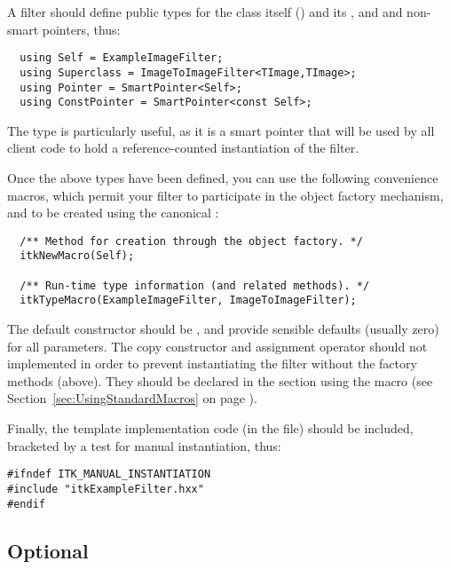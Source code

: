 A filter should define public types for the class itself () and
its , and  and non- smart pointers,
thus:

\begin{verbatim}
  using Self = ExampleImageFilter;
  using Superclass = ImageToImageFilter<TImage,TImage>;
  using Pointer = SmartPointer<Self>;
  using ConstPointer = SmartPointer<const Self>;
\end{verbatim}

The  type is particularly useful, as it is a smart pointer
that will be used by all client code to hold a reference-counted
instantiation of the filter.

Once the above types have been defined, you can use the following
convenience macros, which permit your filter to participate in the object
factory mechanism, and to be created using the canonical :

\begin{verbatim}
  /** Method for creation through the object factory. */
  itkNewMacro(Self);

  /** Run-time type information (and related methods). */
  itkTypeMacro(ExampleImageFilter, ImageToImageFilter);
\end{verbatim}

The default constructor should be , and provide sensible
defaults (usually zero) for all parameters. The copy constructor and
assignment operator should not implemented in order to prevent instantiating
the filter without the factory methods (above). They should be declared in the
 section using the  macro
(see Section~\ref{sec:UsingStandardMacros} on page
\pageref{sec:UsingStandardMacros}).

Finally, the template implementation code (in the  file) should
be included, bracketed by a test for manual instantiation, thus:

\begin{verbatim}
#ifndef ITK_MANUAL_INSTANTIATION
#include "itkExampleFilter.hxx"
#endif
\end{verbatim}

\subsection{Optional}

